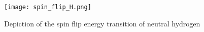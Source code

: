 \begin{figure}[th]
	\centering
	\texttt{[image: spin\_flip\_H.png]}
	\caption[Epoch of Reionization Timeline]{Depiction of the spin flip energy transition of neutral hydrogen}
	\label{fig:reionization}
\end{figure}
